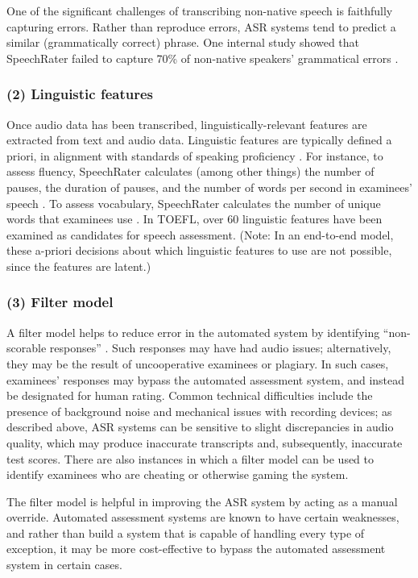 \documentclass [PhD] {uclathes}
\begin{document}
One of the significant challenges of transcribing non-native speech is faithfully capturing errors. Rather than reproduce errors, ASR systems tend to predict a similar (grammatically correct) phrase. One internal study showed that SpeechRater failed to capture 70\% of non-native speakers’ grammatical errors \citep{yoon2019features}.

\subsubsection{(2) Linguistic features}

Once audio data has been transcribed, linguistically-relevant features are extracted from text and audio data. Linguistic features are typically defined a priori, in alignment with standards of speaking proficiency \citep[e.g.][]{brown2005examination}. For instance, to assess fluency, SpeechRater calculates (among other things) the number of pauses, the duration of pauses, and the number of words per second in examinees’ speech \citep{hsieh2019features}. To assess vocabulary, SpeechRater calculates the number of unique words that examinees use \citep{yoon2019features}. In TOEFL, over 60 linguistic features have been examined as candidates for speech assessment. (Note: In an end-to-end model, these a-priori decisions about which linguistic features to use are not possible, since the features are latent.)

\subsubsection{(3) Filter model}

A filter model helps to reduce error in the automated system by identifying “non-scorable responses” \citep{loukina2019scoring}. Such responses may have had audio issues; alternatively, they may be the result of uncooperative examinees or plagiary. In such cases, examinees’ responses may bypass the automated assessment system, and instead be designated for human rating. Common technical difficulties include the presence of background noise and mechanical issues with recording devices; as described above, ASR systems can be sensitive to slight discrepancies in audio quality, which may produce inaccurate transcripts and, subsequently, inaccurate test scores. There are also instances in which a filter model can be used to identify examinees who are cheating or otherwise gaming the system.

The filter model is helpful in improving the ASR system by acting as a manual override. Automated assessment systems are known to have certain weaknesses, and rather than build a system that is capable of handling every type of exception, it may be more cost-effective to bypass the automated assessment system in certain cases.
\end{document}
